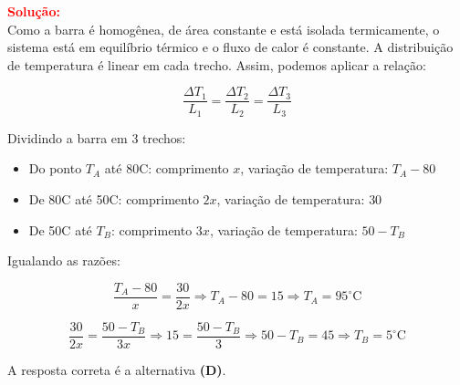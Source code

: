 \begin{flushleft}
\vspace{0.5cm}

\textcolor{red}{\textbf{Solução:}}\\

Como a barra é homogênea, de área constante e está isolada termicamente, o sistema está em equilíbrio térmico e o fluxo de calor é constante. A distribuição de temperatura é linear em cada trecho. Assim, podemos aplicar a relação:

\[
\frac{\Delta T_1}{L_1} = \frac{\Delta T_2}{L_2} = \frac{\Delta T_3}{L_3}
\]

Dividindo a barra em 3 trechos:
\begin{itemize}
\item Do ponto $T_A$ até 80\textdegree C: comprimento $x$, variação de temperatura: $T_A - 80$
\item De 80\textdegree C até 50\textdegree C: comprimento $2x$, variação de temperatura: $30$
\item De 50\textdegree C até $T_B$: comprimento $3x$, variação de temperatura: $50 - T_B$
\end{itemize}

Igualando as razões:

\[
\frac{T_A - 80}{x} = \frac{30}{2x} \Rightarrow T_A - 80 = 15 \Rightarrow T_A = 95^\circ \text{C}
\]

\[
\frac{30}{2x} = \frac{50 - T_B}{3x} \Rightarrow 15 = \frac{50 - T_B}{3} \Rightarrow 50 - T_B = 45 \Rightarrow T_B = 5^\circ \text{C}
\]

\vspace{0.3cm}

A resposta correta é a alternativa \colorbox{green!50}{\textbf{(D)}}.

\end{flushleft}


